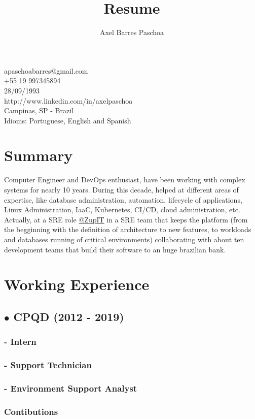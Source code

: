 \documentclass{article}
\makeatletter
\renewcommand{\maketitle}{

\begin{center}

{\huge\bfseries\theauthor}

apaschoabarres@gmail.com \\
+55 19 997345894 \\
28/09/1993 \\
http://www.linkedin.com/in/axelpaschoa \\
Campinas, SP - Brazil \\
Idioms: Portuguese, English and Spanish
\end{center}
}
\makeatother
\begin{document}
\title{Resume}
\author{Axel Barres Paschoa}

\maketitle

\section{Summary}

Computer Engineer and DevOps enthusiast, have been working with complex systems for nearly 10 years. During this decade, helped at different areas of expertise, like database administration, automation, lifecycle of applications, Linux Administration, IaaC, Kubernetes, CI/CD, cloud administration, etc. Actually, at a SRE role \href{https://github.com/ZupIT}{@ZupIT} in a SRE team that keeps the platform (from the begginning with the definition of architecture to new features, to workloads and databases running of critical environments) collaborating with about ten development teams that build their software to an huge brazilian bank.


\section{Working Experience}

\subsection{$\bullet$ CPQD (2012 - 2019)}

\subsubsection{- Intern}

\subsubsection{- Support Technician}

\subsubsection{- Environment Support Analyst \\}

\subsubsection{Contibutions \\}
\end{document}
